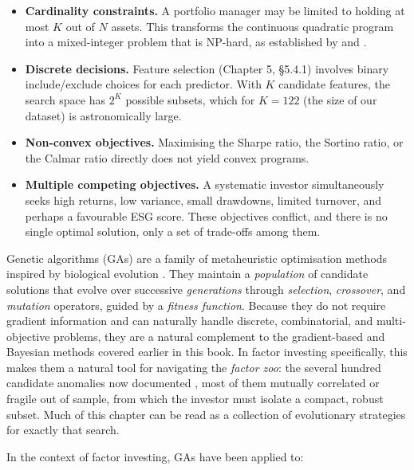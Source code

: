 \begin{itemize}
\item \textbf{Cardinality constraints.} A portfolio manager may be limited to holding at most $K$ out of $N$ assets. This transforms the continuous quadratic program into a mixed-integer problem that is NP-hard, as established by \cite{Bienstock1996} and \cite{Chang2000}.
\item \textbf{Discrete decisions.} Feature selection (Chapter 5, §5.4.1) involves binary include/exclude choices for each predictor. With $K$ candidate features, the search space has $2^K$ possible subsets, which for $K=122$ (the size of our dataset) is astronomically large.
\item \textbf{Non-convex objectives.} Maximising the Sharpe ratio, the Sortino ratio, or the Calmar ratio directly does not yield convex programs.
\item \textbf{Multiple competing objectives.} A systematic investor simultaneously seeks high returns, low variance, small drawdowns, limited turnover, and perhaps a favourable ESG score. These objectives conflict, and there is no single optimal solution, only a set of trade-offs among them.
\end{itemize}

Genetic algorithms (GAs) are a family of metaheuristic optimisation methods inspired by biological evolution \citep{Holland1975, Goldberg1989}. They maintain a \textit{population} of candidate solutions that evolve over successive \textit{generations} through \textit{selection}, \textit{crossover}, and \textit{mutation} operators, guided by a \textit{fitness function}. Because they do not require gradient information and can naturally handle discrete, combinatorial, and multi-objective problems, they are a natural complement to the gradient-based and Bayesian methods covered earlier in this book. In factor investing specifically, this makes them a natural tool for navigating the \textit{factor zoo}: the several hundred candidate anomalies now documented \citep{harvey2016and}, most of them mutually correlated or fragile out of sample, from which the investor must isolate a compact, robust subset. Much of this chapter can be read as a collection of evolutionary strategies for exactly that search.

In the context of factor investing, GAs have been applied to:


